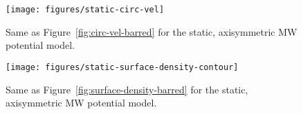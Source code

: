\documentclass[letterpaper,12pt,preprint]{aastex}
\begin{document}
\clearpage
\begin{figure}[p]
\begin{center}
\texttt{[image: figures/static-circ-vel]}
\caption{Same as Figure~\ref{fig:circ-vel-barred} for the static, axisymmetric MW potential model. }
\label{fig:circ-vel-static}
\end{center}
\end{figure}

\clearpage
\begin{figure}[p]
\begin{center}
\texttt{[image: figures/static-surface-density-contour]}
\caption{Same as Figure~\ref{fig:surface-density-barred} for the static, axisymmetric MW potential model. }
\label{fig:surface-density-static}
\end{center}
\end{figure}
\end{document}

